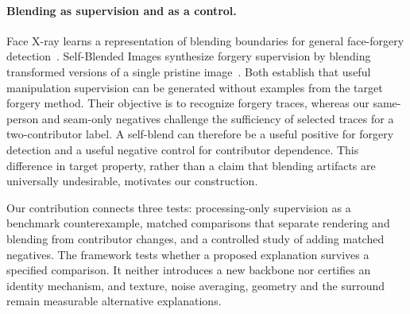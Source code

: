 \paragraph{Blending as supervision and as a control.}
Face X-ray learns a representation of blending boundaries for general face-forgery detection~\cite{li2020facexray}. Self-Blended Images synthesize forgery supervision by blending transformed versions of a single pristine image~\cite{shiohara2022sbi}. Both establish that useful manipulation supervision can be generated without examples from the target forgery method. Their objective is to recognize forgery traces, whereas our same-person and seam-only negatives challenge the sufficiency of selected traces for a two-contributor label. A self-blend can therefore be a useful positive for forgery detection and a useful negative control for contributor dependence. This difference in target property, rather than a claim that blending artifacts are universally undesirable, motivates our construction.

Our contribution connects three tests: processing-only supervision as a benchmark counterexample, matched comparisons that separate rendering and blending from contributor changes, and a controlled study of adding matched negatives. The framework tests whether a proposed explanation survives a specified comparison. It neither introduces a new backbone nor certifies an identity mechanism, and texture, noise averaging, geometry and the surround remain measurable alternative explanations.
